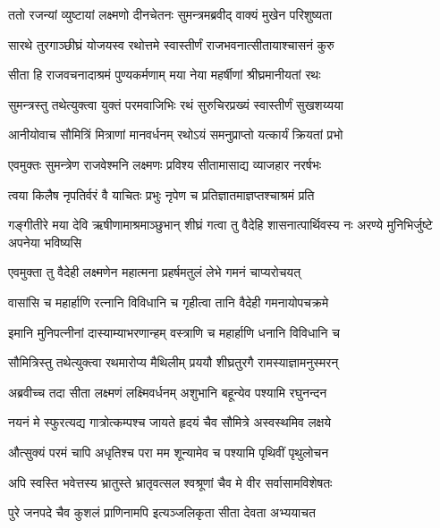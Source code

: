 
\twolineshloka
{ततो रजन्यां व्युष्टायां लक्ष्मणो दीनचेतनः}
{सुमन्त्रमब्रवीद् वाक्यं मुखेन परिशुष्यता} %

\twolineshloka
{सारथे तुरगाञ्छीघ्रं योजयस्व रथोत्तमे}
{स्वास्तीर्णं राजभवनात्सीतायाश्चासनं कुरु} %

\twolineshloka
{सीता हि राजवचनादाश्रमं पुण्यकर्मणाम्}
{मया नेया महर्षीणां श्रीघ्रमानीयतां रथः} %

\twolineshloka
{सुमन्त्रस्तु तथेत्युक्त्वा युक्तं परमवाजिभिः}
{रथं सुरुचिरप्रख्यं स्वास्तीर्णं सुखशय्यया} %

\twolineshloka
{आनीयोवाच सौमित्रिं मित्राणां मानवर्धनम्}
{रथोऽयं समनुप्राप्तो यत्कार्यं क्रियतां प्रभो} %

\twolineshloka
{एवमुक्तः सुमन्त्रेण राजवेश्मनि लक्ष्मणः}
{प्रविश्य सीतामासाद्य व्याजहार नरर्षभः} %

\twolineshloka
{त्वया किलैष नृपतिर्वरं वै याचितः प्रभुः}
{नृपेण च प्रतिज्ञातमाज्ञप्तश्चाश्रमं प्रति} %

\threelineshloka
{गङ्गीतीरे मया देवि ऋषीणामाश्रमाञ्छुभान्}
{शीघ्रं गत्वा तु वैदेहि शासनात्पार्थिवस्य नः}
{अरण्ये मुनिभिर्जुष्टे अपनेया भविष्यसि} %

\twolineshloka
{एवमुक्ता तु वैदेही लक्ष्मणेन महात्मना}
{प्रहर्षमतुलं लेभे गमनं चाप्यरोचयत्} %

\twolineshloka
{वासांसि च महार्हाणि रत्नानि विविधानि च}
{गृहीत्वा तानि वैदेही गमनायोपचक्रमे} %

\twolineshloka
{इमानि मुनिपत्नीनां दास्याम्याभरणान्हम्}
{वस्त्राणि च महार्हाणि धनानि विविधानि च} %

\twolineshloka
{सौमित्रिस्तु तथेत्युक्त्वा रथमारोप्य मैथिलीम्}
{प्रययौ शीघ्रतुरगै रामस्याज्ञामनुस्मरन्} %

\twolineshloka
{अब्रवीच्च तदा सीता लक्ष्मणं लक्ष्मिवर्धनम्}
{अशुभानि बहून्येव पश्यामि रघुनन्दन} %

\twolineshloka
{नयनं मे स्फुरत्यद्य गात्रोत्कम्पश्च जायते}
{हृदयं चैव सौमित्रे अस्वस्थमिव लक्षये} %

\twolineshloka
{औत्सुक्यं परमं चापि अधृतिश्च परा मम}
{शून्यामेव च पश्यामि पृथिवीं पृथुलोचन} %

\twolineshloka
{अपि स्वस्ति भवेत्तस्य भ्रातुस्ते भ्रातृवत्सल}
{श्वश्रूणां चैव मे वीर सर्वासामविशेषतः} %

\twolineshloka
{पुरे जनपदे चैव कुशलं प्राणिनामपि}
{इत्यञ्जलिकृता सीता देवता अभ्ययाचत} %

